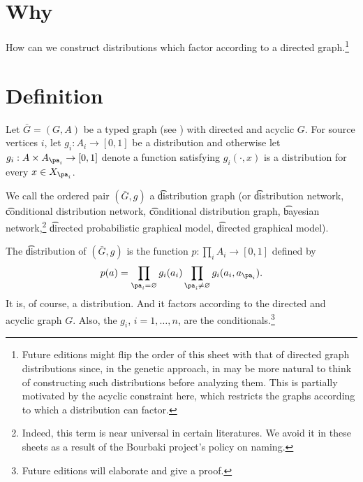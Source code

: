 

\section*{Why}

How can we construct distributions which factor according to a directed graph.\footnote{Future editions might flip the order of this sheet with that of directed graph distributions since, in the genetic approach, in may be more natural to think of constructing such distributions before analyzing them. This is partially motivated by the acyclic constraint here, which restricts the graphs according to which a distribution can factor.}

\section*{Definition}

Let $\bar{G} = (G, A)$ be a typed graph (see ) with directed and acyclic $G$.
For source vertices $i$, let $g_i: A_i \to [0, 1]$ be a distribution and otherwise let $g_{i}: A \times  A_{\pa_i} \to [0, 1]$ denote a function satisfying $g_i(\cdot , x)$ is a distribution for every $x \in X_{\pa_i}$.

We call the ordered pair $(\bar{G}, g)$ a \t{distribution graph} (or \t{distribution network}, \t{conditional distribution network}, \t{conditional distribution graph}, \t{bayesian network},\footnote{Indeed, this term is near universal in certain literatures. We avoid it in these sheets as a result of the Bourbaki project's policy on naming.}
\t{directed probabilistic graphical model}, \t{directed graphical model}).

The \t{distribution} of $(\bar{G}, g)$ is the function $p: \prod_{i} A_i \to [0, 1]$ defined by
    \[
p(a)
=
\prod_{\pa_i = \varnothing} g_i(a_i)
\prod_{\pa_i \neq \varnothing} g_i(a_i, a_{\pa_i}).
    \]
It is, of course, a distribution.
And it factors according to the directed and acyclic graph $G$.
Also, the $g_i$, $i = 1, \dots , n$, are the conditionals.\footnote{Future editions will elaborate and give a proof.}

\blankpage